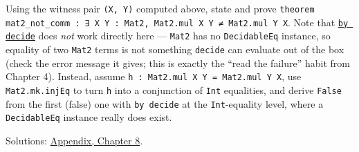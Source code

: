 \begin{enumerate}
  Using the witness pair \texttt{(X, Y)} computed above, state and prove \texttt{theorem mat2\_\allowbreak{}not\_\allowbreak{}comm : ∃ X Y : Mat2, Mat2.mul X Y ≠ Mat2.mul Y X}. Note that \href{https://lean-lang.org/doc/reference/latest/Tactic-Proofs/Tactic-Reference/}{\texttt{by decide}} does \emph{not} work directly here --- \texttt{Mat2} has no \texttt{DecidableEq} instance, so equality of two \texttt{Mat2} terms is not something \texttt{decide} can evaluate out of the box (check the error message it gives; this is exactly the ``read the failure'' habit from Chapter 4). Instead, assume \texttt{h : Mat2.mul X Y = Mat2.mul Y X}, use \texttt{Mat2.mk.injEq} to turn \texttt{h} into a conjunction of \texttt{Int} equalities, and derive \texttt{False} from the first (false) one with \texttt{by decide} at the \texttt{Int}-equality level, where a \texttt{DecidableEq} instance really does exist.
\end{enumerate}

Solutions: \hyperref[sec:14-appendix-solutions:07-chapter-8:1]{Appendix, Chapter 8}.

